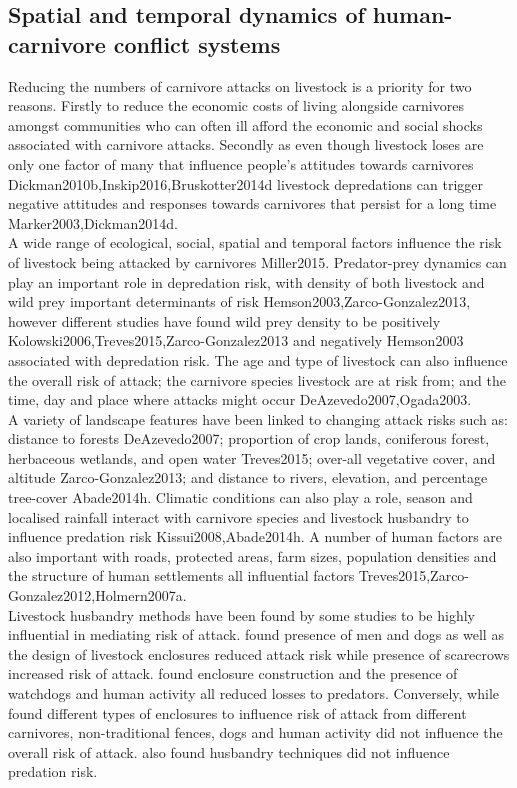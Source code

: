 \subsection{Spatial and temporal dynamics of human-carnivore conflict systems}

Reducing the numbers of carnivore attacks on livestock is a priority for two reasons. Firstly to reduce the economic costs of living alongside carnivores amongst communities who can often ill afford the economic and social shocks associated with carnivore attacks. Secondly as even though livestock loses are only one factor of many that influence people's attitudes towards carnivores {Dickman2010b,Inskip2016,Bruskotter2014d} livestock depredations can trigger negative attitudes and responses towards carnivores that persist for a long time {Marker2003,Dickman2014d}.\\

A wide range of ecological, social, spatial and temporal factors influence the risk of livestock being attacked by carnivores {Miller2015}. Predator-prey dynamics can play an important role in depredation risk, with density of both livestock and wild prey important determinants of risk {Hemson2003,Zarco-Gonzalez2013}, however different studies have found wild prey density to be positively {Kolowski2006,Treves2015,Zarco-Gonzalez2013} and negatively {Hemson2003} associated with depredation risk. The age and type of livestock can also influence the overall risk of attack; the carnivore species livestock are at risk from; and the time, day and place where attacks might occur {DeAzevedo2007,Ogada2003}. \\

A variety of landscape features have been linked to changing attack risks such as: distance to forests {DeAzevedo2007}; proportion of crop lands, coniferous forest, herbaceous wetlands, and open water {Treves2015}; over-all vegetative cover, and altitude {Zarco-Gonzalez2013}; and distance to rivers, elevation, and percentage tree-cover {Abade2014h}. Climatic conditions can also play a role, season and localised rainfall interact with carnivore species and livestock husbandry to influence predation risk {Kissui2008,Abade2014h}. A number of human factors are also important with roads, protected areas, farm sizes, population densities and the structure of human settlements all influential factors {Treves2015,Zarco-Gonzalez2012,Holmern2007a}.\\

Livestock husbandry methods have been found by some studies to be highly influential in mediating risk of attack. \citet{Woodroffe2007} found presence of men and dogs as well as the design of livestock enclosures reduced attack risk while presence of scarecrows increased risk of attack. \citet{Ogada2003} found enclosure construction and the presence of watchdogs and human activity all reduced losses to predators. Conversely, while \citet{Kolowski2006} found different types of enclosures to influence risk of attack from different carnivores, non-traditional fences, dogs and human activity did not influence the overall risk of attack. \citet{Abade2014h} also found husbandry techniques did not influence predation risk.\\

